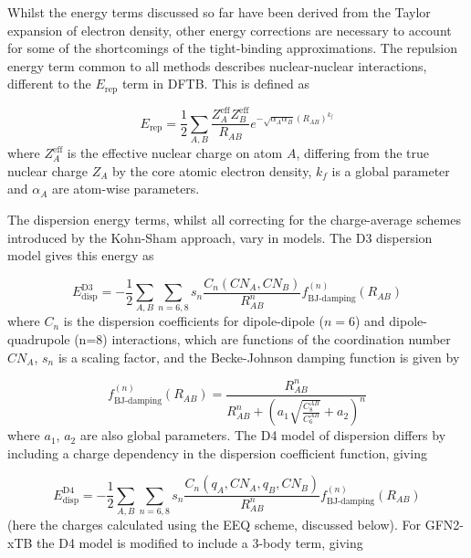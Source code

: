 Whilst the energy terms discussed so far have been derived from the Taylor expansion
of electron density, other energy corrections are necessary to account for some 
of the shortcomings of the tight-binding approximations. The repulsion energy term
common to all methods describes nuclear-nuclear interactions,
different to the $E_{\text{rep}}$ term in DFTB. This is defined as

\begin{equation}
    E_{\text{rep}} = \frac{1}{2}\sum_{A,B} \frac{Z^{\text{eff}}_A Z^{\text{eff}}_B}{R_{AB}} e^{-\sqrt{\alpha_A \alpha_B} \left(R_{AB}\right)^{k_f}}
\end{equation}
%
where $Z^{\text{eff}}_A$ is the effective nuclear charge on atom $A$, differing 
from the true nuclear charge $Z_A$ by the core atomic electron density, $k_f$ is
a global parameter and $\alpha_A$ are atom-wise parameters.

The dispersion energy terms, whilst all correcting for the charge-average schemes
introduced by the Kohn-Sham approach, vary in models. The D3 dispersion model gives
this energy as

\begin{equation}
    E^{\text{D3}}_\text{disp} = -\frac{1}{2}\sum_{A,B}\sum_{n=6,8} s_n \frac{C_n\left(CN_A, CN_B\right)}{R^n_{AB}} f^{\left(n\right)}_{\text{BJ-damping}} \left(R_{AB}\right)
\end{equation}
%
where $C_n$ is the dispersion coefficients for dipole-dipole ($n=6$) and dipole-quadrupole
(n=8) interactions, which are functions of the coordination number $CN_A$, $s_n$
is a scaling factor, and the Becke-Johnson damping function \cite{Johnson2005, Becke2005} 
is given by

\begin{equation}
    f^{\left(n\right)}_{\text{BJ-damping}}\left(R_{AB}\right) = \frac{R^n_{AB}}{R^n_{AB} + \left(a_1 \sqrt{\frac{C_8^{AB}}{C_6^{AB}}} + a_2 \right)^n} 
\end{equation}
%
where $a_1$, $a_2$ are also global parameters. The D4 model of dispersion differs
by including a charge dependency in the dispersion coefficient function, giving

\begin{equation}
    E^{\text{D4}}_\text{disp} = -\frac{1}{2}\sum_{A,B}\sum_{n=6,8} s_n \frac{C_n\left(q_A, CN_A, q_B, CN_B\right)}{R^n_{AB}} f^{\left(n\right)}_{\text{BJ-damping}} \left(R_{AB}\right)
\end{equation}
%
(here the charges calculated using the EEQ scheme, discussed below). For GFN2-xTB
the D4 model is modified to include a 3-body term, giving

